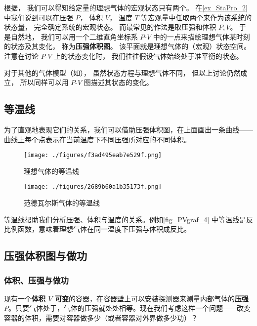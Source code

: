 
\begin{issues}
\issueDraft
\end{issues}


根据， 我们可以得知给定量的理想气体的宏观状态只有两个。 在\autoref{ex_StaPro_2}~ 中我们说到可以在压强 $P$， 体积 $V$， 温度 $T$ 等宏观量中任取两个来作为该系统的状态量， 完全确定系统的宏观状态。 而最常见的作法是取压强和体积 $P,V$。 于是自然地， 我们可以用一个二维直角坐标系 $P$-$V$ 中的一点来描绘理想气体某时刻的状态及其变化， 称为\textbf{压强体积图}。 该平面就是理想气体的（宏观）状态空间。 注意在讨论 $P$-$V$ 上的状态变化时， 我们往往假设气体始终处于准平衡的状态。

对于其他的气体模型（如）， 虽然状态方程与理想气体不同， 但以上讨论仍然成立， 所以同样可以用 $P$-$V$ 图描述其状态的变化。


\subsection{等温线}
为了直观地表现它们的关系，我们可以借助压强体积图，在上面画出一条曲线——曲线上每个点表示在当前温度下不同压强所对应的不同体积。
\begin{figure}[ht]
\centering
\texttt{[image: ./figures/f3ad495eab7e529f.png]}
\caption{理想气体的等温线} \label{fig_PVgraf_4}
\end{figure}
\begin{figure}[ht]
\centering
\texttt{[image: ./figures/2689b60a1b35173f.png]}
\caption{范德瓦尔斯气体的等温线} \label{fig_PVgraf_3}
\end{figure}

等温线帮助我们分析压强、体积与温度的关系。例如\autoref{fig_PVgraf_4} 中等温线是反比例函数，意味着理想气体在同一温度下压强与体积成反比。

\subsection{压强体积图与做功}

\subsubsection{体积、压强与做功}
现有一个\textbf{体积 $V$ 可变}的容器，在容器壁上可以安装探测器来测量内部气体的\textbf{压强 $P$}。只要气体处于，气体的压强就处处相等。现在我们考虑这样一个问题——改变容器的体积，需要对容器做多少（或者容器对外界做多少功）？

